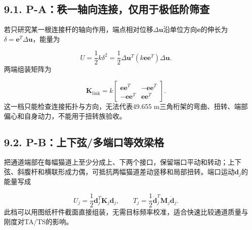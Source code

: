 \documentclass[UTF8,a4paper,11pt,fontset=none]{ctexart}
\begin{document}
\subsection*{9.1. P-A：秩一轴向连接，仅用于极低阶筛查}
若只研究某一根连接杆的轴向作用，端点相对位移\(\Delta\mathbf u\)\allowbreak{}沿单位方向\(\mathbf e\)\allowbreak{}的伸长为\(\delta=\mathbf e^T\Delta\mathbf u\)\allowbreak{}，能量为\par
\[
U=\frac12k\delta^2
=\frac12\Delta\mathbf u^T
\left(k\mathbf e\mathbf e^T\right)
\Delta\mathbf u.
\]
两端组装矩阵为\par
\[
\mathbf K_{\mathrm{link}}=k
\begin{bmatrix}
\mathbf e\mathbf e^T&-\mathbf e\mathbf e^T\\
-\mathbf e\mathbf e^T&\mathbf e\mathbf e^T
\end{bmatrix}.
\]
这一档只能检查连接拓扑与方向，无法代表49.655 m三角桁架的弯曲、扭转、端部偏心和自身动力，不能用于扭转族验收。\par
{}
\subsection*{9.2. P-B：上下弦/多端口等效梁格}
把通道端部在每幅猫道上至少分成上、下两个接口，保留端口平动和转动；上下弦、斜腹杆和横联形成力偶，可抵抗两幅猫道差动竖移和局部扭转。端口运动\(\mathbf d_j\)\allowbreak{}的能量写成\par
\[
U_j=\frac12\mathbf d_j^T\mathbf K_j\mathbf d_j,
\qquad
T_j=\frac12\dot{\mathbf d}_j^T\mathbf M_j\dot{\mathbf d}_j.
\]
此档可以用图纸杆件截面直接组装，无需目标频率校准，适合快速比较通道质量与刚度对TA/TS的影响。\par
{}
\end{document}
